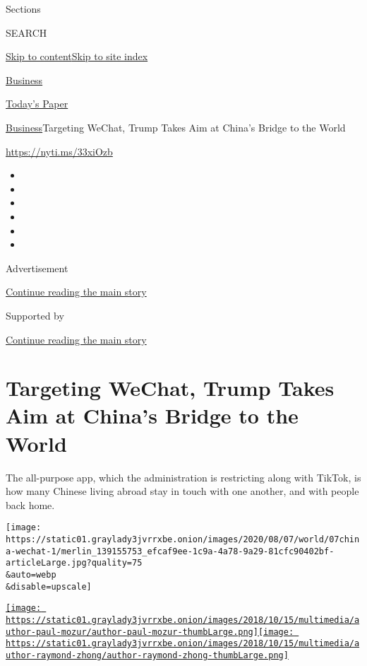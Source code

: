 Sections

SEARCH

\protect\hyperlink{site-content}{Skip to
content}\protect\hyperlink{site-index}{Skip to site index}

\href{https://www.nytimes3xbfgragh.onion/section/business}{Business}

\href{https://myaccount.nytimes3xbfgragh.onion/auth/login?response_type=cookie\&client_id=vi}{}

\href{https://www.nytimes3xbfgragh.onion/section/todayspaper}{Today's
Paper}

\href{/section/business}{Business}\textbar{}Targeting WeChat, Trump
Takes Aim at China's Bridge to the World

\href{https://nyti.ms/33xiOzb}{https://nyti.ms/33xiOzb}

\begin{itemize}
\item
\item
\item
\item
\item
\item
\end{itemize}

Advertisement

\protect\hyperlink{after-top}{Continue reading the main story}

Supported by

\protect\hyperlink{after-sponsor}{Continue reading the main story}

\hypertarget{targeting-wechat-trump-takes-aim-at-chinas-bridge-to-the-world}{%
\section{Targeting WeChat, Trump Takes Aim at China's Bridge to the
World}\label{targeting-wechat-trump-takes-aim-at-chinas-bridge-to-the-world}}

The all-purpose app, which the administration is restricting along with
TikTok, is how many Chinese living abroad stay in touch with one
another, and with people back home.

\texttt{[image: https://static01.graylady3jvrrxbe.onion/images/2020/08/07/world/07china-wechat-1/merlin\_139155753\_efcaf9ee-1c9a-4a78-9a29-81cfc90402bf-articleLarge.jpg?quality=75\\\&auto=webp\\\&disable=upscale]}

\href{https://www.nytimes3xbfgragh.onion/by/paul-mozur}{\texttt{[image: https://static01.graylady3jvrrxbe.onion/images/2018/10/15/multimedia/author-paul-mozur/author-paul-mozur-thumbLarge.png]}}\href{https://www.nytimes3xbfgragh.onion/by/raymond-zhong}{\texttt{[image: https://static01.graylady3jvrrxbe.onion/images/2018/10/15/multimedia/author-raymond-zhong/author-raymond-zhong-thumbLarge.png]}}

